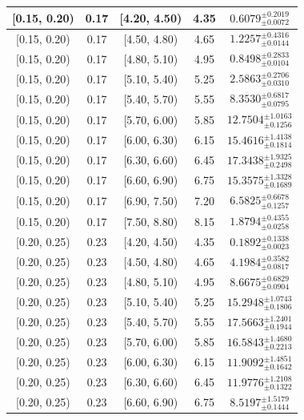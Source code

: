 \begin{longtable}{|c|c|c|c|c|}
\hline
[0.15, 0.20) & 0.17 & [4.20, 4.50) & 4.35 & $0.6079^{ \pm 0.2019 }_{ \pm 0.0072 }$ \\ 
\hline
[0.15, 0.20) & 0.17 & [4.50, 4.80) & 4.65 & $1.2257^{ \pm 0.4316 }_{ \pm 0.0144 }$ \\ 
\hline
[0.15, 0.20) & 0.17 & [4.80, 5.10) & 4.95 & $0.8498^{ \pm 0.2833 }_{ \pm 0.0104 }$ \\ 
\hline
[0.15, 0.20) & 0.17 & [5.10, 5.40) & 5.25 & $2.5863^{ \pm 0.2706 }_{ \pm 0.0310 }$ \\ 
\hline
[0.15, 0.20) & 0.17 & [5.40, 5.70) & 5.55 & $8.3530^{ \pm 0.6817 }_{ \pm 0.0795 }$ \\ 
\hline
[0.15, 0.20) & 0.17 & [5.70, 6.00) & 5.85 & $12.7504^{ \pm 1.0163 }_{ \pm 0.1256 }$ \\ 
\hline
[0.15, 0.20) & 0.17 & [6.00, 6.30) & 6.15 & $15.4616^{ \pm 1.4138 }_{ \pm 0.1814 }$ \\ 
\hline
[0.15, 0.20) & 0.17 & [6.30, 6.60) & 6.45 & $17.3438^{ \pm 1.9325 }_{ \pm 0.2498 }$ \\ 
\hline
[0.15, 0.20) & 0.17 & [6.60, 6.90) & 6.75 & $15.3575^{ \pm 1.3328 }_{ \pm 0.1689 }$ \\ 
\hline
[0.15, 0.20) & 0.17 & [6.90, 7.50) & 7.20 & $6.5825^{ \pm 0.6678 }_{ \pm 0.1257 }$ \\ 
\hline
[0.15, 0.20) & 0.17 & [7.50, 8.80) & 8.15 & $1.8794^{ \pm 0.4355 }_{ \pm 0.0258 }$ \\ 
\hline
[0.20, 0.25) & 0.23 & [4.20, 4.50) & 4.35 & $0.1892^{ \pm 0.1338 }_{ \pm 0.0023 }$ \\ 
\hline
[0.20, 0.25) & 0.23 & [4.50, 4.80) & 4.65 & $4.1984^{ \pm 0.3582 }_{ \pm 0.0817 }$ \\ 
\hline
[0.20, 0.25) & 0.23 & [4.80, 5.10) & 4.95 & $8.6675^{ \pm 0.6829 }_{ \pm 0.0904 }$ \\ 
\hline
[0.20, 0.25) & 0.23 & [5.10, 5.40) & 5.25 & $15.2948^{ \pm 1.0743 }_{ \pm 0.1806 }$ \\ 
\hline
[0.20, 0.25) & 0.23 & [5.40, 5.70) & 5.55 & $17.5663^{ \pm 1.2401 }_{ \pm 0.1944 }$ \\ 
\hline
[0.20, 0.25) & 0.23 & [5.70, 6.00) & 5.85 & $16.5843^{ \pm 1.4680 }_{ \pm 0.2213 }$ \\ 
\hline
[0.20, 0.25) & 0.23 & [6.00, 6.30) & 6.15 & $11.9092^{ \pm 1.4851 }_{ \pm 0.1642 }$ \\ 
\hline
[0.20, 0.25) & 0.23 & [6.30, 6.60) & 6.45 & $11.9776^{ \pm 1.2108 }_{ \pm 0.1322 }$ \\ 
\hline
[0.20, 0.25) & 0.23 & [6.60, 6.90) & 6.75 & $8.5197^{ \pm 1.5179 }_{ \pm 0.1444 }$ \\ 

\end{longtable}
